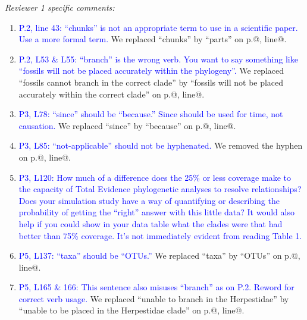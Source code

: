 \documentclass[12pt,letterpaper]{article}
\renewcommand{\subsection}[1]{%
\bigskip
\begin{center}
\begin{large}
\normalfont\itshape #1
\end{large}
\end{center}}
\begin{document}
\subsection{Reviewer 1 specific comments:}
\begin{enumerate}
\item{\textcolor{blue}{P.2, line 43: ``chunks'' is not an appropriate term to use in a scientific paper. Use a more formal term.}}
We replaced ``chunks'' by ``parts'' on p.@, line@.

\item{\textcolor{blue}{P.2, L53 \& L55: ``branch'' is the wrong verb. You want to say something like ``fossils will not be placed accurately within the phylogeny''.}}
We replaced ``fossils cannot branch in the correct clade'' by ``fossils will not be placed accurately within the correct clade'' on p.@, line@.

\item{\textcolor{blue}{P3, L78: ``since'' should be ``because.'' Since should be used for time, not causation.}}
We replaced ``since'' by ``because'' on p.@, line@.

\item{\textcolor{blue}{P3, L85: ``not-applicable'' should not be hyphenated.}}
We removed the hyphen on p.@, line@.

\item{\textcolor{blue}{P3, L120: How much of a difference does the 25\% or less coverage make to the capacity of Total Evidence phylogenetic analyses to resolve relationships? Does your simulation study have a way of quantifying or describing the probability of getting the ``right'' answer with this little data? It would also help if you could show in your data table what the clades were that had better than 75\% coverage. It’s not immediately evident from reading Table 1.}}


\item{\textcolor{blue}{P5, L137: ``taxa'' should be ``OTUs.''}}
We replaced ``taxa'' by ``OTUs'' on p.@, line@.

\item{\textcolor{blue}{P5, L165 \& 166: This sentence also misuses ``branch'' as on P.2. Reword for correct verb usage.}}
We replaced ``unable to branch in the Herpestidae'' by ``unable to be placed in the Herpestidae clade'' on p.@, line@.


\end{enumerate}
\end{document}
